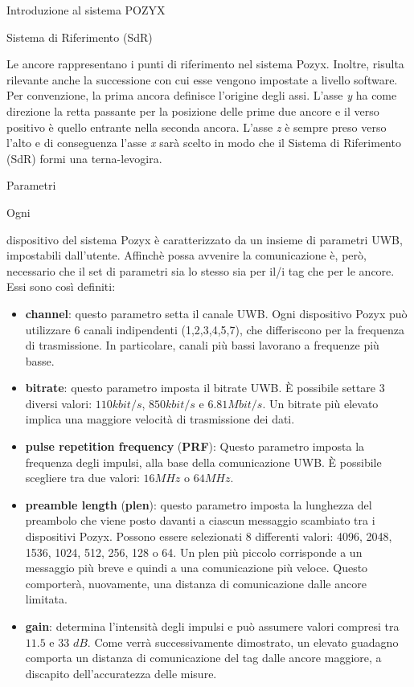 \documentclass[12pt]{report}
\begin{document}
\begin{section}{Introduzione al sistema POZYX}
	\begin{subsection}{Sistema di Riferimento (SdR)}

		Le ancore rappresentano i punti di riferimento nel sistema Pozyx. Inoltre, risulta rilevante anche la successione con cui esse vengono impostate a livello software. Per convenzione, la prima ancora definisce l’origine degli assi. L'asse \textit{y} ha come direzione la retta passante per la posizione delle prime due 					ancore e il verso positivo è quello entrante nella seconda ancora. L’asse \textit{z} è sempre preso verso l’alto e di conseguenza l’asse \textit{x} sarà scelto in modo che il Sistema di Riferimento (SdR) formi una terna-levogira.

	\end{subsection}

	\begin{subsection}{Parametri}

		\hypertarget{SS4}{Ogni} dispositivo del sistema Pozyx è caratterizzato da un insieme di parametri UWB, impostabili dall’utente. Affinchè possa avvenire la comunicazione è, però, necessario che il set di parametri sia lo stesso sia per il/i tag che per le ancore.
		Essi sono così definiti:

		\begin{itemize}
			\item \textbf{channel}: questo parametro setta il canale UWB. Ogni dispositivo Pozyx può utilizzare 6 canali indipendenti (1,2,3,4,5,7), che differiscono per la frequenza di trasmissione. In particolare, canali più bassi lavorano a frequenze più basse.
			\item \textbf{bitrate}: questo parametro imposta il bitrate UWB. È possibile settare 3 diversi valori: $110kbit/s$, $850kbit/s$ e $6.81Mbit/s$. Un bitrate più elevato implica una maggiore velocità di trasmissione dei dati.
			\item \textbf{pulse repetition frequency} (\textbf{PRF}): Questo parametro imposta la frequenza degli impulsi, alla base della comunicazione UWB. È possibile scegliere tra due valori: $16MHz$ o $64MHz$. 
			\item \textbf{preamble length} (\textbf{plen}): questo parametro imposta la lunghezza del preambolo che viene posto davanti a ciascun messaggio scambiato tra i dispositivi Pozyx. Possono essere selezionati 8 differenti valori: 4096, 2048, 1536, 1024, 512, 256, 128 o 64. Un plen più 										 									piccolo corrisponde a un messaggio più breve e quindi a una comunicazione più veloce. Questo comporterà, nuovamente, una distanza di comunicazione dalle ancore limitata.
			\item \textbf{gain}: determina l’intensità degli impulsi e può assumere valori compresi tra $11.5$ e $33$ $dB$. Come verrà successivamente dimostrato, un elevato guadagno comporta un distanza di comunicazione del tag dalle ancore maggiore, a discapito dell'accuratezza delle misure.
		\end{itemize}


\end{subsection}
\end{section}
\end{document}
